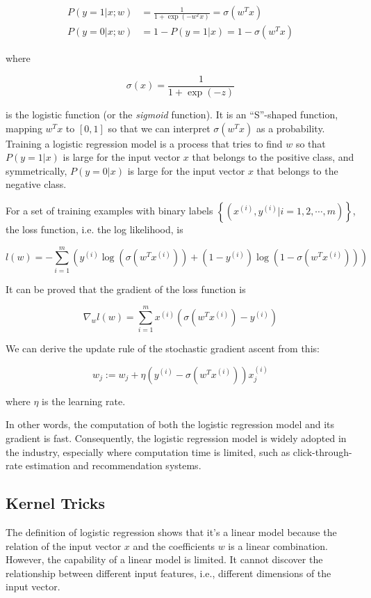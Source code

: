     \begin{align*}
        P(y=1 | x;w) &= \frac{1}{1+\exp(-w^Tx)} = \sigma(w^Tx)\\
        P(y=0 | x;w) &= 1-P(y=1 | x) = 1-\sigma(w^Tx)
    \end{align*}

    where

    \[
    \sigma(x) = \frac{1}{1+\exp(-z)}
    \]

    is the logistic function (or the \emph{sigmoid} function).
    It is an ``S''-shaped function, mapping $w^Tx$ to $[0,1]$
    so that we can interpret $\sigma(w^Tx)$ as a probability.
    Training a logistic regression model is a process that tries to find $w$ so that
    $P(y=1 | x)$ is large for the input vector $x$ that belongs to the positive class,
    and symmetrically, $P(y=0 | x)$ is large for the input vector $x$ that belongs to the negative class.

    For a set of training examples with binary labels $\left\{ (x^{(i)}, y^{(i)} | i = 1, 2, \cdots, m) \right\}$,
    the loss function, i.e. the log likelihood, is

    \[
    l(w) = -\sum_{i=1}^m \left( y^{(i)}\log\left(\sigma(w^Tx^{(i)})\right) + (1-y^{(i)})\log\left(1-\sigma(w^Tx^{(i)})\right) \right)
    \]

    It can be proved \cite{Ng2000} that the gradient of the loss function is

    \[
    \nabla_w l(w) = \sum_{i=1}^m x^{(i)}\left(\sigma(w^Tx^{(i)}) - y^{(i)}\right)
    \]

    We can derive the update rule of the stochastic gradient ascent from this:

    \[
    w_j := w_j + \eta \left( y^{(i)} - \sigma(w^Tx^{(i)}) \right) x_j^{(i)}
    \]

    where $\eta$ is the learning rate.

    In other words, the computation of both the logistic regression model and its gradient is fast.
    Consequently, the logistic regression model is widely adopted in the industry,
    especially where computation time is limited, such as click-through-rate estimation \cite{DBLP:journals/corr/WangZY16}
    and recommendation systems.

    \subsection{Kernel Tricks}

        The definition of logistic regression shows that it's a linear model
        because the relation of the input vector $x$ and the coefficients $w$ is a linear combination.
        However, the capability of a linear model is limited.
        It cannot discover the relationship between different input features,
        i.e., different dimensions of the input vector.

